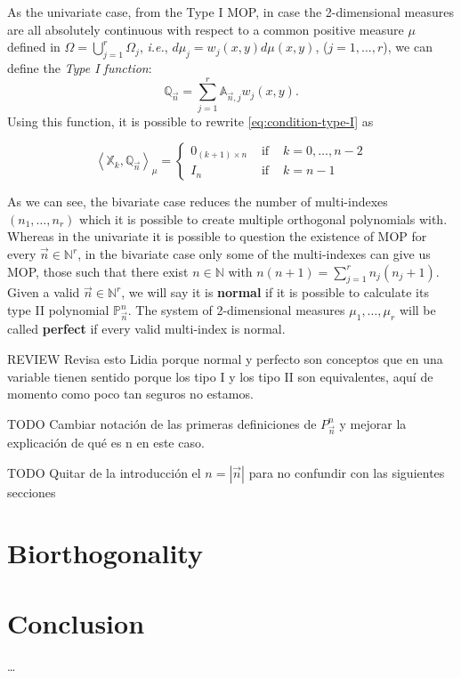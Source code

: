\documentclass[12pt,a4]{article}
\theoremstyle{plain}
\newcommand{\N}[0]{\mathbb{N}}
\newcommand{\cred}[1]{{\color{red} #1}}
\newcommand{\cb}[1]{{\color{blue}#1}}
\newcommand{\prodesc}[2]{\left\langle #1 , #2 \right\rangle}
\begin{document}
As the univariate case, from the Type I MOP, in case the 2-dimensional measures are all absolutely continuous with respect to a common positive measure $\mu$ defined in $\Omega = \displaystyle\bigcup_{j=1}^r \Omega_j$, \textit{i.e.}, $d\mu_j = w_j(x,y)d\mu(x,y)$, ($j=1,\dots,r$), we can define the \textit{Type I function}:
\begin{equation}
    \label{eq:type-I-function-2-vars}
    \mathbb Q_{\vec n} = \sum_{j=1}^r \mathbb A_{\vec n,j}w_j(x,y).
\end{equation}
Using this function, it is possible to rewrite \eqref{eq:condition-type-I} as

\begin{equation}
    \prodesc{\mathbb X_k}{\mathbb Q_{\vec n}}_\mu = \left\{\begin{array}{ccl}
        0_{(k+1)\times n} &   \text{ if } & k=0,\dots,n-2 \\
        I_n & \text{ if } & k=n-1 
    \end{array}\right.     
\end{equation}

As we can see, the bivariate case reduces the number of multi-indexes $(n_1,\dots,n_r)$ which it is possible to create multiple orthogonal polynomials with. Whereas in the univariate it is possible to question the existence of MOP for every $\vec n\in \N^r$, in the bivariate case only some of the multi-indexes can give us MOP, those such that there exist $n\in\N$ with $n(n+1)=\displaystyle\sum_{j=1}^r n_j (n_j+1)$. Given a valid $\vec n\in\N^r$, we will say it is \textbf{normal} if it is possible to calculate its type II polynomial $\mathbb P_{\vec n}^n$. The system of 2-dimensional measures $\mu_1,\dots,\mu_r$ will be called \textbf{perfect} if every valid multi-index is normal.

\cb{REVIEW Revisa esto Lidia porque normal y perfecto son conceptos que en una variable tienen sentido porque los tipo I y los tipo II son equivalentes, aquí de momento como poco tan seguros no estamos.}

\cred{TODO Cambiar notación de las primeras definiciones de $P_{\vec n}^n$ y mejorar la explicación de qué es n en este caso.}

\cred{TODO Quitar de la introducción el $n=|\vec n|$ para no confundir con las siguientes secciones}

\section{Biorthogonality}



\section{Conclusion}
\dots

\nocite{*}
{}

\end{document}
